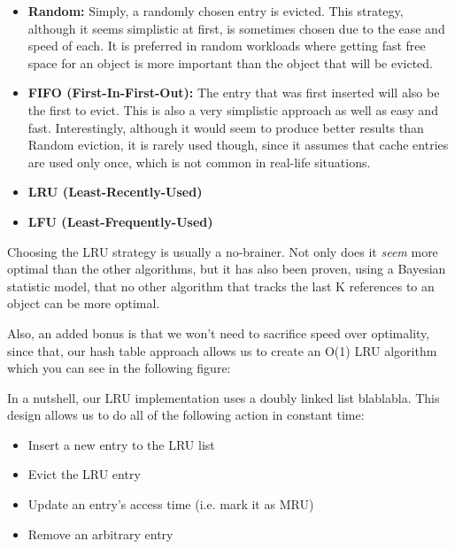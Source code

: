 %
\begin{itemize}
	\item \textbf{Random:} Simply, a randomly chosen entry is evicted. This 
		strategy, although it seems simplistic at first, is sometimes chosen 
		due to the ease and speed of each. It is preferred in random workloads 
		where getting fast free space for an object is more important than the 
		object that will be evicted.
	\item \textbf{FIFO (First-In-First-Out):} The entry that was first inserted 
		will also be the first to evict. This is also a very simplistic 
		approach as well as easy and fast. Interestingly, although it would 
		seem to produce better results than Random eviction, it is rarely used 
		though, since it assumes that cache entries are used only once, which 
		is not common in real-life situations.
	\item \textbf{LRU (Least-Recently-Used)}
	\item \textbf{LFU (Least-Frequently-Used)}
\end{itemize}

Choosing the LRU strategy is usually a no-brainer. Not only does it 
\textit{seem} more optimal than the other algorithms, but it has also been 
proven, using a Bayesian statistic model, that no other algorithm that tracks 
the last K references to an object can be more optimal.

Also, an added bonus is that we won't need to sacrifice speed over optimality, 
since that, our hash table approach allows us to create an O(1) LRU algorithm 
which you can see in the following figure:


In a nutshell, our LRU implementation uses a doubly linked list blablabla.
This design allows us to do all of the following action in constant time:

\begin{itemize}
	\item Insert a new entry to the LRU list
	\item Evict the LRU entry
	\item Update an entry's access time (i.e. mark it as MRU)
	\item Remove an arbitrary entry
\end{itemize}

